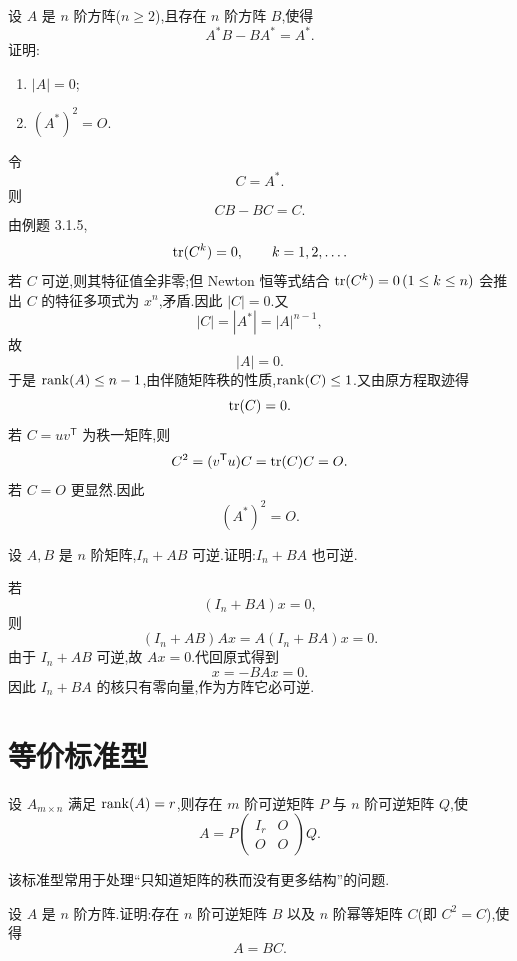 \begin{example}
设 $A$ 是 $n$ 阶方阵($n\geq2$),且存在 $n$ 阶方阵 $B$,使得
\[
A^*B-BA^*=A^*.
\]
证明:
\begin{enumerate}
  \item $|A|=0$;
  \item $(A^*)^2=O$.
\end{enumerate}
\end{example}
\exampleblank

\begin{solution}
令
\[
C=A^*.
\]
则
\[
CB-BC=C.
\]
由例题 3.1.5,
\[
\operatorname{tr}(C^k)=0,
\qquad k=1,2,\ldots.
\]
若 $C$ 可逆,则其特征值全非零;但 Newton 恒等式结合 $\operatorname{tr}(C^k)=0\,(1\leq k\leq n)$ 会推出 $C$ 的特征多项式为 $x^n$,矛盾.因此 $|C|=0$.又
\[
|C|=|A^*|=|A|^{n-1},
\]
故
\[
\boxed{|A|=0}.
\]
于是 $\operatorname{rank}(A)\leq n-1$,由伴随矩阵秩的性质,$\operatorname{rank}(C)\leq1$.又由原方程取迹得
\[
\operatorname{tr}(C)=0.
\]
若 $C=uv^{\mathsf T}$ 为秩一矩阵,则
\[
C^2=(v^{\mathsf T}u)C=\operatorname{tr}(C)C=O.
\]
若 $C=O$ 更显然.因此
\[
\boxed{(A^*)^2=O}.
\]
\end{solution}

\begin{example}[\markstar]
设 $A,B$ 是 $n$ 阶矩阵,$I_n+AB$ 可逆.证明:$I_n+BA$ 也可逆.
\end{example}
\exampleblank

\begin{solution}
若
\[
(I_n+BA)x=0,
\]
则
\[
(I_n+AB)Ax=A(I_n+BA)x=0.
\]
由于 $I_n+AB$ 可逆,故 $Ax=0$.代回原式得到
\[
x=-BAx=0.
\]
因此 $I_n+BA$ 的核只有零向量,作为方阵它必可逆.
\end{solution}


\newpage

\section{等价标准型}

\begin{theorem}[\marktwostar]
设 $A_{m\times n}$ 满足 $\operatorname{rank}(A)=r$,则存在 $m$ 阶可逆矩阵 $P$ 与 $n$ 阶可逆矩阵 $Q$,使
\[
A=P
\begin{pmatrix}
I_r&O\\O&O
\end{pmatrix}
Q.
\]
\end{theorem}

\begin{remark}
该标准型常用于处理``只知道矩阵的秩而没有更多结构''的问题.
\end{remark}

\begin{example}
设 $A$ 是 $n$ 阶方阵.证明:存在 $n$ 阶可逆矩阵 $B$ 以及 $n$ 阶幂等矩阵 $C$(即 $C^2=C$),使得
\[
A=BC.
\]
\end{example}
\exampleblank

